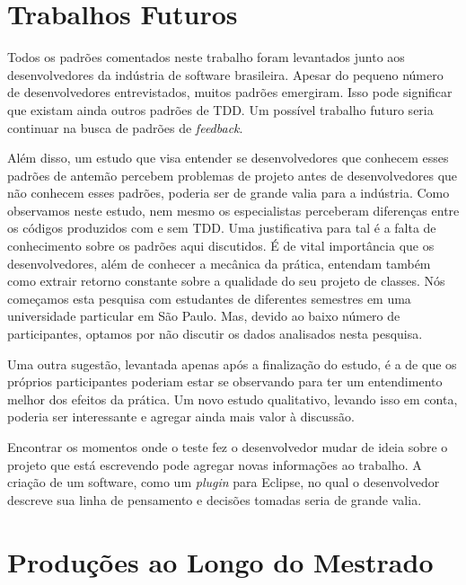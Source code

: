 \section{Trabalhos Futuros}

Todos os padrões comentados neste trabalho foram levantados junto aos 
desenvolvedores da indústria de software brasileira. Apesar do pequeno
número de desenvolvedores entrevistados, muitos padrões emergiram. Isso
pode significar que existam ainda outros padrões de TDD. Um possível trabalho
futuro seria continuar na busca de padrões de \textit{feedback}.

Além disso, um estudo que visa entender se desenvolvedores que conhecem
esses padrões de antemão percebem problemas de projeto antes de desenvolvedores
que não conhecem esses padrões, poderia ser de grande valia para a indústria.
Como observamos neste estudo, nem mesmo os especialistas perceberam diferenças
entre os códigos produzidos com e sem TDD. Uma justificativa para tal é
a falta de conhecimento sobre os padrões aqui discutidos.
É de vital importância que os desenvolvedores, além
de conhecer a mecânica da prática, entendam também como extrair retorno constante
sobre a qualidade do seu projeto de classes. Nós começamos esta pesquisa com
estudantes de diferentes semestres em uma universidade particular em São Paulo. Mas,
devido ao baixo número de participantes, optamos por não discutir os dados
analisados nesta pesquisa.

Uma outra sugestão, levantada apenas após a finalização do estudo, é a de que
os próprios participantes poderiam estar se observando para ter um entendimento
melhor dos efeitos da prática. Um novo estudo qualitativo, levando isso em conta,
poderia ser interessante e agregar ainda mais valor à discussão. 

Encontrar os momentos onde o teste fez o desenvolvedor mudar de ideia sobre o projeto
que está escrevendo pode agregar novas informações ao trabalho. A criação de um software,
como um \textit{plugin} para Eclipse, no qual o desenvolvedor descreve sua linha de pensamento
e decisões tomadas seria de grande valia.

\section{Produções ao Longo do Mestrado}

